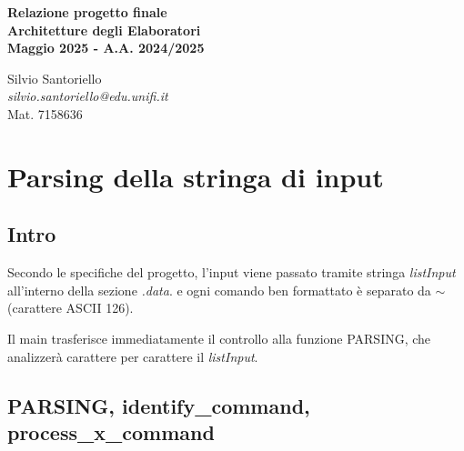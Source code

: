 \documentclass[11pt]{report}
\date{}
\author{Silvio Santoriello}
\begin{document}
\justifying
    
     \thispagestyle{empty}
    
    \vspace*{4cm} %
    
    \begin{center}
        {\Huge \bfseries Relazione progetto finale\\
        Architetture degli Elaboratori\\
         Maggio 2025 - A.A. 2024/2025\\}
    \end{center}
    
    \vspace{3cm} %
    
    \begin{center}
        
    \end{center}
    
    \vspace{3cm} %
    
    \begin{center}
        {\large
        Silvio Santoriello\\[0.3cm]
        \textit{silvio.santoriello@edu.unifi.it}\\[0.3cm]
        Mat. 7158636
        }
    \end{center}
    
    \newpage
    \tableofcontents
    

    \chapter{Parsing della stringa di input}
    
    \section{Intro}
    
    Secondo le specifiche del progetto, l'input viene passato tramite stringa \textit{listInput} all'interno della sezione \textit{.data}. e ogni comando ben formattato è separato da $\sim$ (carattere ASCII 126).

    Il main trasferisce immediatamente il controllo alla funzione PARSING, che analizzerà carattere per carattere il \textit{listInput}.

    \section{PARSING, identify\_command, process\_\textbf{x}\_command}
\end{document}
